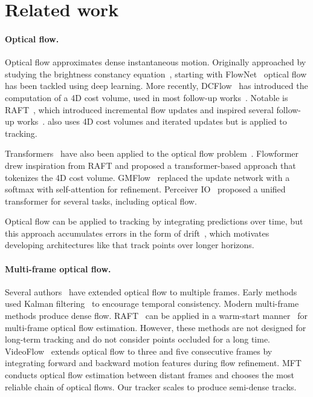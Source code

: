 \section{Related work}%
\label{sec:related}

\paragraph{Optical flow.}

Optical flow approximates dense instantaneous motion.
Originally approached by studying the brightness constancy equation~\cite{horn1981determining, lucas1981iterative, Black:ICCV:1993, bruhn2005lucas}, starting with
FlowNet~\cite{dosovitskiy2015flownet,ilg2017flownet} optical flow has been tackled using deep learning.
More recently, DCFlow~\cite{Xu_2017_CVPR} has introduced the computation of a 4D cost volume, used in most follow-up works~\cite{sun2018pwc, wang2020displacement, raft}.
Notable is RAFT~\cite{raft}, which introduced incremental flow updates and inspired several follow-up works~\cite{jiang2021learning, xu2021high, jiang2021learning, zhang2021separable}.
\method also uses 4D cost volumes and iterated updates but is applied to tracking.

Transformers~\cite{vaswani2017attention} have also been applied to the optical flow problem~\cite{huang2022flowformer, shi2023flowformer++, zhao2022global}.
Flowformer~\cite{huang2022flowformer} drew inspiration from RAFT and proposed a transformer-based approach that tokenizes the 4D cost volume.
GMFlow~\cite{zhao2022global} replaced the update network with a softmax with self-attention for refinement.
Perceiver IO~\cite{jaegle22perceiver} proposed a unified transformer for several tasks, including optical flow.

Optical flow can be applied to tracking by integrating predictions over time, but this approach accumulates errors in the form of drift~\cite{pips}, which motivates developing architectures like \method that track points over longer horizons.

\paragraph{Multi-frame optical flow.}

Several authors~\cite{ren2019fusion, shi2023videoflow, janai2018unsupervised, luo2023continuous} have extended optical flow to multiple frames.
Early methods used Kalman filtering~\cite{chin1994probabilistic, elad1998recursive} to encourage temporal consistency.
Modern multi-frame methods produce dense flow.
RAFT~\cite{raft} can be applied in a warm-start manner~\cite{sui2022craft, sun2022skflow} for multi-frame optical flow estimation.
However, these methods are not designed for long-term tracking and do not consider points occluded for a long time.
VideoFlow~\cite{shi2023videoflow} extends optical flow to three and five consecutive frames by integrating forward and backward motion features during flow refinement.
MFT~\cite{neoral2023mft} conducts optical flow estimation between distant frames and chooses the most reliable chain of optical flows.
Our tracker scales to produce semi-dense tracks.


